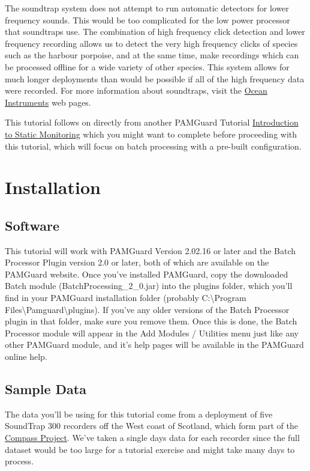 \documentclass[
]{article}
\begin{document}
The soundtrap system does not attempt to run automatic detectors for
lower frequency sounds. This would be too complicated for the low power
processor that soundtraps use. The combination of high frequency click
detection and lower frequency recording allows us to detect the very
high frequency clicks of species such as the harbour porpoise, and at
the same time, make recordings which can be processed offline for a wide
variety of other species. This system allows for much longer deployments
than would be possible if all of the high frequency data were recorded.
For more information about soundtraps, visit the
\href{https://www.oceaninstruments.co.nz/}{Ocean Instruments} web pages.

This tutorial follows on directly from another PAMGuard Tutorial
\href{https://www.pamguard.org/tutorials/staticmonitoring.html}{Introduction
to Static Monitoring} which you might want to complete before proceeding
with this tutorial, which will focus on batch processing with a
pre-built configuration.

\section{Installation}\label{installation}

\subsection{Software}\label{software}

This tutorial will work with PAMGuard Version 2.02.16 or later and the
Batch Processor Plugin version 2.0 or later, both of which are available
on the PAMGuard website. Once you've installed PAMGuard, copy the
downloaded Batch module (BatchProcessing\_2\_0.jar) into the plugins
folder, which you'll find in your PAMGuard installation folder (probably
C:\textbackslash Program
Files\textbackslash Pamguard\textbackslash plugins). If you've any older
versions of the Batch Processor plugin in that folder, make sure you
remove them. Once this is done, the Batch Processor module will appear
in the Add Modules / Utilities menu just like any other PAMGuard module,
and it's help pages will be available in the PAMGuard online help.

\subsection{Sample Data}\label{sample-data}

The data you'll be using for this tutorial come from a deployment of
five SoundTrap 300 recorders off the West coast of Scotland, which form
part of the
\href{https://www.sams.ac.uk/science/projects/compass/}{Compass
Project}. We've taken a single days data for each recorder since the
full dataset would be too large for a tutorial exercise and might take
many days to process.
\end{document}
